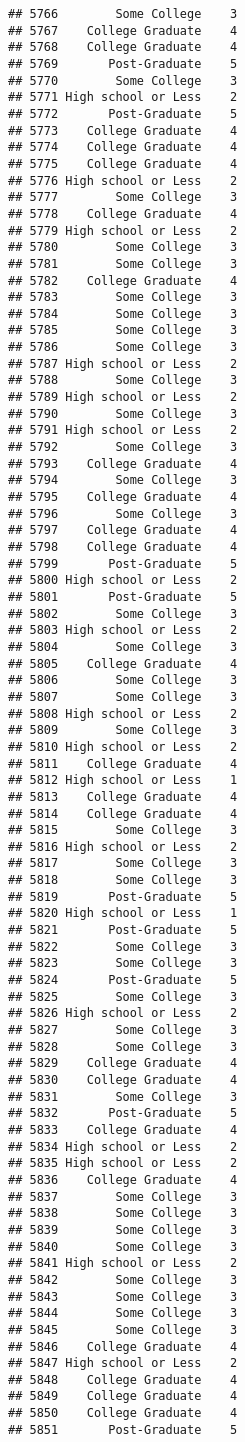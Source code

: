 \documentclass[
]{article}
\begin{document}
\begin{verbatim}
## 5766        Some College    3
## 5767    College Graduate    4
## 5768    College Graduate    4
## 5769       Post-Graduate    5
## 5770        Some College    3
## 5771 High school or Less    2
## 5772       Post-Graduate    5
## 5773    College Graduate    4
## 5774    College Graduate    4
## 5775    College Graduate    4
## 5776 High school or Less    2
## 5777        Some College    3
## 5778    College Graduate    4
## 5779 High school or Less    2
## 5780        Some College    3
## 5781        Some College    3
## 5782    College Graduate    4
## 5783        Some College    3
## 5784        Some College    3
## 5785        Some College    3
## 5786        Some College    3
## 5787 High school or Less    2
## 5788        Some College    3
## 5789 High school or Less    2
## 5790        Some College    3
## 5791 High school or Less    2
## 5792        Some College    3
## 5793    College Graduate    4
## 5794        Some College    3
## 5795    College Graduate    4
## 5796        Some College    3
## 5797    College Graduate    4
## 5798    College Graduate    4
## 5799       Post-Graduate    5
## 5800 High school or Less    2
## 5801       Post-Graduate    5
## 5802        Some College    3
## 5803 High school or Less    2
## 5804        Some College    3
## 5805    College Graduate    4
## 5806        Some College    3
## 5807        Some College    3
## 5808 High school or Less    2
## 5809        Some College    3
## 5810 High school or Less    2
## 5811    College Graduate    4
## 5812 High school or Less    1
## 5813    College Graduate    4
## 5814    College Graduate    4
## 5815        Some College    3
## 5816 High school or Less    2
## 5817        Some College    3
## 5818        Some College    3
## 5819       Post-Graduate    5
## 5820 High school or Less    1
## 5821       Post-Graduate    5
## 5822        Some College    3
## 5823        Some College    3
## 5824       Post-Graduate    5
## 5825        Some College    3
## 5826 High school or Less    2
## 5827        Some College    3
## 5828        Some College    3
## 5829    College Graduate    4
## 5830    College Graduate    4
## 5831        Some College    3
## 5832       Post-Graduate    5
## 5833    College Graduate    4
## 5834 High school or Less    2
## 5835 High school or Less    2
## 5836    College Graduate    4
## 5837        Some College    3
## 5838        Some College    3
## 5839        Some College    3
## 5840        Some College    3
## 5841 High school or Less    2
## 5842        Some College    3
## 5843        Some College    3
## 5844        Some College    3
## 5845        Some College    3
## 5846    College Graduate    4
## 5847 High school or Less    2
## 5848    College Graduate    4
## 5849    College Graduate    4
## 5850    College Graduate    4
## 5851       Post-Graduate    5
\end{verbatim}
\end{document}
